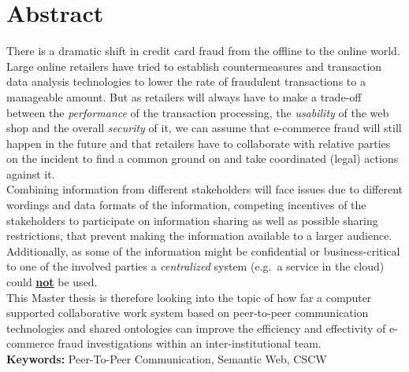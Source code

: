 
\chapter*{Abstract}

There is a dramatic shift in credit card fraud from the offline to the online world.
Large online retailers have tried to establish countermeasures and transaction data analysis technologies
to lower the rate of fraudulent transactions to a manageable amount. But as retailers will always have to
make a trade-off between the \textit{performance} of the transaction processing, the \textit{usability} of the web shop
and the overall \textit{security} of it, we can assume that e-commerce fraud will still happen in the future and that
retailers have to collaborate with relative parties on the incident to find a common ground on and take coordinated
(legal) actions against it.
\\[0.8em]
Combining information from different stakeholders will face issues due to different wordings and data formats of the
information, competing incentives of the stakeholders to participate on information sharing as well as possible sharing
restrictions, that prevent making the information available to a larger audience. Additionally, as some of the information
might be confidential or business-critical to one of the involved parties a \textit{centralized} system
(e.g.\ a service in the cloud) could \textbf{\underline{not}} be used.
\\[0.8em]
This Master thesis is therefore looking into the topic of how far a computer supported collaborative work system
based on peer-to-peer communication technologies and shared ontologies can improve the efficiency and effectivity
of e-commerce fraud investigations within an inter-institutional team.
\\[2em]
\textbf{Keywords:} Peer-To-Peer Communication, Semantic Web, CSCW
